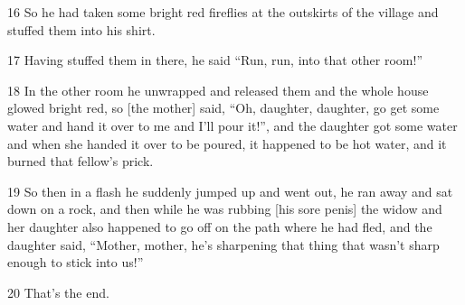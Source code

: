 16 So he had taken some bright red fireflies at the outskirts of the village and
stuffed them into his shirt.

17 Having stuffed them in there, he said ``Run, run, into that other room!''

18 In the other room he unwrapped and released them and the whole house glowed
bright red, so [the mother] said, ``Oh, daughter, daughter, go get some water and
hand it over to me and I'll pour it!'', and the daughter got some water and when
she handed it over to be poured, it happened to be hot water, and it burned that
fellow's prick.

19 So then in a flash he suddenly jumped up and went out, he ran away and sat down
on a rock, and then while he was rubbing [his sore penis] the widow and her daughter
also happened to go off on the path where he had fled, and the daughter said, ``Mother,
mother, he's sharpening that thing that wasn't sharp enough to stick into us!''

20 That's the end.

